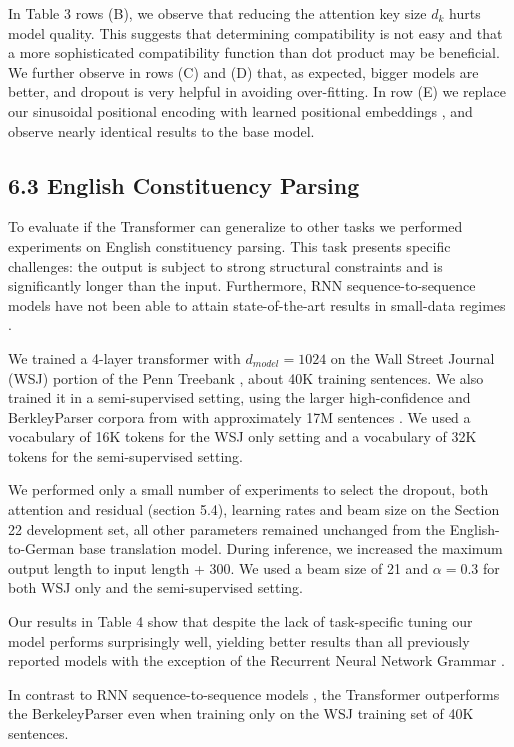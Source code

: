 \documentclass[conference]{IEEEtran}
\begin{document}
In Table 3 rows (B), we observe that reducing the attention key size $d_k$ hurts model quality. This suggests that determining compatibility is not easy and that a more sophisticated compatibility function than dot product may be beneficial. We further observe in rows (C) and (D) that, as expected, bigger models are better, and dropout is very helpful in avoiding over-fitting. In row (E) we replace our sinusoidal positional encoding with learned positional embeddings \cite{ref9}, and observe nearly identical results to the base model.

\subsection{6.3 English Constituency Parsing}

To evaluate if the Transformer can generalize to other tasks we performed experiments on English constituency parsing. This task presents specific challenges: the output is subject to strong structural constraints and is significantly longer than the input. Furthermore, RNN sequence-to-sequence models have not been able to attain state-of-the-art results in small-data regimes \cite{ref37}.

We trained a 4-layer transformer with $d_{model} = 1024$ on the Wall Street Journal (WSJ) portion of the Penn Treebank \cite{ref25}, about 40K training sentences. We also trained it in a semi-supervised setting, using the larger high-confidence and BerkleyParser corpora from with approximately 17M sentences \cite{ref37}. We used a vocabulary of 16K tokens for the WSJ only setting and a vocabulary of 32K tokens for the semi-supervised setting.

We performed only a small number of experiments to select the dropout, both attention and residual (section 5.4), learning rates and beam size on the Section 22 development set, all other parameters remained unchanged from the English-to-German base translation model. During inference, we increased the maximum output length to input length + 300. We used a beam size of 21 and $\alpha = 0.3$ for both WSJ only and the semi-supervised setting.

Our results in Table 4 show that despite the lack of task-specific tuning our model performs surprisingly well, yielding better results than all previously reported models with the exception of the Recurrent Neural Network Grammar \cite{ref8}.

In contrast to RNN sequence-to-sequence models \cite{ref37}, the Transformer outperforms the BerkeleyParser \cite{ref29} even when training only on the WSJ training set of 40K sentences.
\end{document}
